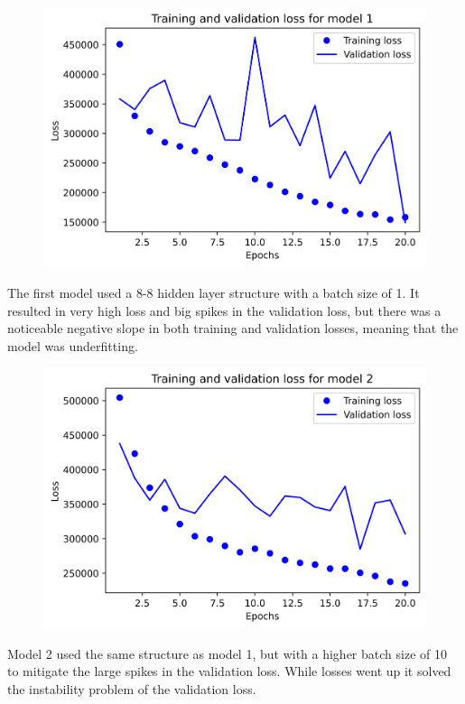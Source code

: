 \documentclass{article}
\begin{document}
    \begin{figure}[H]
        \includegraphics[width=\linewidth]{images/model1.png}
    \end{figure}
    The first model used a 8-8 hidden layer structure with a batch size of 1.
    It resulted in very high loss and big spikes in the validation loss, but there was a noticeable 
    negative slope in both training and validation losses, meaning that the model was underfitting.
    
    \begin{figure}[H]
        \includegraphics[width=\linewidth]{images/model2.png}
    \end{figure}
    Model 2 used the same structure as model 1, but with a higher batch size of 10 to mitigate the large spikes in the validation loss. While 
    losses went up it solved the instability problem of the validation loss.
\end{document}
